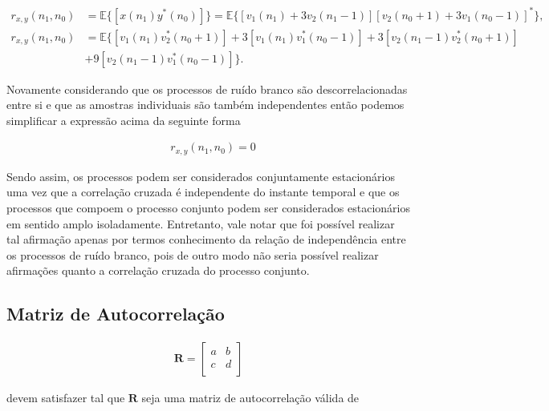         \begin{align}
            r_{x,y}(n_{1},n_{0}) &= \mathbb{E}\{[x(n_{1})y^{*}(n_{0})]\} = \mathbb{E}\{[v_{1}(n_{1}) + 3v_{2}(n_{1}-1)][v_{2}(n_{0}+1) + 3v_{1}(n_{0}-1)]^{*}\}, \\
            r_{x,y}(n_{1},n_{0}) &= \mathbb{E}\{[v_{1}(n_{1})v^{*}_{2}(n_{0}+1)] + 3[v_{1}(n_{1})v^{*}_{1}(n_{0}-1)] + 3[v_{2}(n_{1}-1)v^{*}_{2}(n_{0}+1)] \\ 
            &+ 9[v_{2}(n_{1}-1)v^{*}_{1}(n_{0}-1)]\}.  
        \end{align}
        
        Novamente considerando que os processos de ruído branco são descorrelacionadas entre si e que as amostras individuais são também independentes então podemos simplificar a expressão acima da seguinte forma
        
        \begin{align}
            &r_{x,y}(n_{1},n_{0}) = 0 
        \end{align}
        
        Sendo assim, os processos podem ser considerados conjuntamente estacionários uma vez que a correlação cruzada é independente do instante temporal e que os processos que compoem o processo conjunto podem 
        ser considerados estacionários em sentido amplo isoladamente. Entretanto, vale notar que foi possível realizar tal afirmação apenas por termos conhecimento da relação de independência entre os processos 
        de ruído branco, pois de outro modo não seria possível realizar afirmações quanto a correlação cruzada do processo conjunto.
    

\subsection{Matriz de Autocorrelação} %
\begin{align}
    \mathbf{R} = \left[
    \begin{matrix}
        a & b  \\
        c & d  \\
    \end{matrix} \right]
\end{align}

devem satisfazer tal que $\mathbf{R}$ seja uma matriz de autocorrelação válida de


